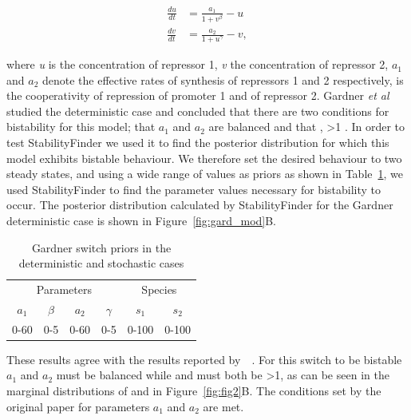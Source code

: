{\begin{align*}
\frac{du}{dt} &= \frac{a_1}{1+v^{\beta}} - u\\
\frac{dv}{dt} &= \frac{a_2}{1+u^{\gamma }} - v,
\end{align*}

\noindent where \textit{u} is the concentration of repressor 1, \textit{v} the concentration of repressor 2, $a_1$ and $a_2$ denote the effective rates of synthesis of repressors 1 and 2 respectively, \textbeta{} is the cooperativity of repression of promoter 1 and \textgamma{}of repressor 2. Gardner \textit{et al} studied the deterministic case and concluded that there are two conditions for bistability for this model; that $a_1$ and $a_2$ are balanced and that \textbeta{}, \textgamma{}\textgreater 1 \autocite{Gardner:2000vha}. In order to test StabilityFinder we used it to find the posterior distribution for which this model exhibits bistable behaviour. We therefore set the desired behaviour to two steady states, and using a wide range of values as priors as shown in Table~\ref{tab:gard_det_stoch}, we used StabilityFinder to find the parameter values necessary for bistability to occur. The posterior distribution calculated by StabilityFinder for the Gardner deterministic case is shown in Figure~\ref{fig:gard_mod}B.

\begin{table}[htbp]
\centering
\caption{Gardner switch priors in the deterministic and stochastic cases}
\label{tab:gard_det_stoch}
\begin{tabular}{@{}cccccc@{}}
\toprule
\multicolumn{4}{c}{Parameters}                          & \multicolumn{2}{c}{Species} \\ \cmidrule(lr){1-4}
\cmidrule(lr){5-6}
$a_1$ & $\beta$ & $a_2$ & \multicolumn{1}{c}{$\gamma$} & $s_1$        & $s_2$        \\
0-60  & 0-5     & 0-60  & 0-5                           & 0-100        & 0-100        \\ \bottomrule
\end{tabular}
\end{table}

These results agree with the results reported by~\textcite{Gardner:2000vha}~\autocite{Gardner:2000vha}. For this switch to be bistable $a_1$ and $a_2$ must be balanced while \textbeta{} and \textgamma{} must both be \textgreater 1, as can be seen in the marginal distributions of \textbeta{} and \textgamma{} in Figure~\ref{fig:fig2}B. The conditions set by the original paper for parameters $a_1$ and $a_2$ are met. 

}
